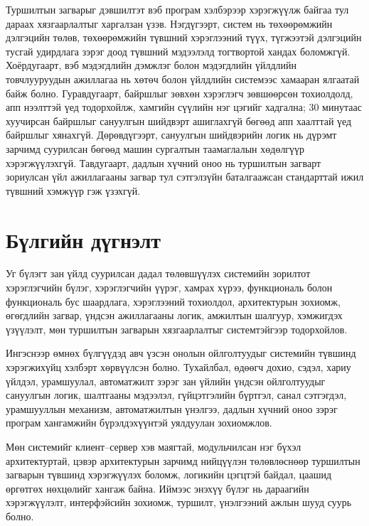 Туршилтын загварыг дэвшилтэт вэб програм хэлбэрээр хэрэгжүүлж байгаа тул дараах хязгаарлалтыг харгалзан үзэв. Нэгдүгээрт, систем нь төхөөрөмжийн дэлгэцийн төлөв, төхөөрөмжийн түвшний хэрэглээний түүх, түгжээтэй дэлгэцийн тусгай удирдлага зэрэг доод түвшний мэдээлэлд тогтвортой хандах боломжгүй. Хоёрдугаарт, вэб мэдэгдлийн дэмжлэг болон мэдэгдлийн үйлдлийн товчлууруудын ажиллагаа нь хөтөч болон үйлдлийн системээс хамааран ялгаатай байж болно. Гуравдугаарт, байршлыг зөвхөн хэрэглэгч зөвшөөрсөн тохиолдолд, апп нээлттэй үед тодорхойлж, хамгийн сүүлийн нэг цэгийг хадгална; 30 минутаас хуучирсан байршлыг сануулгын шийдвэрт ашиглахгүй бөгөөд апп хаалттай үед байршлыг хянахгүй. Дөрөвдүгээрт, сануулгын шийдвэрийн логик нь дүрэмт зарчимд суурилсан бөгөөд машин сургалтын таамаглалын хөдөлгүүр хэрэгжүүлэхгүй. Тавдугаарт, дадлын хүчний оноо нь туршилтын загварт зориулсан үйл ажиллагааны загвар тул сэтгэлзүйн баталгаажсан стандарттай ижил түвшний хэмжүүр гэж үзэхгүй.

\section{Бүлгийн дүгнэлт}

Уг бүлэгт зан үйлд суурилсан дадал төлөвшүүлэх системийн зорилтот хэрэглэгчийн бүлэг, хэрэглэгчийн үүрэг, хамрах хүрээ, функциональ болон функциональ бус шаардлага, хэрэглээний тохиолдол, архитектурын зохиомж, өгөгдлийн загвар, үндсэн ажиллагааны логик, амжилтын шалгуур, хэмжигдэх үзүүлэлт, мөн туршилтын загварын хязгаарлалтыг системтэйгээр тодорхойлов.

Ингэснээр өмнөх бүлгүүдэд авч үзсэн онолын ойлголтуудыг системийн түвшинд хэрэгжихүйц хэлбэрт хөрвүүлсэн болно. Тухайлбал, өдөөгч дохио, сэдэл, хариу үйлдэл, урамшуулал, автоматжилт зэрэг зан үйлийн үндсэн ойлголтуудыг сануулгын логик, шалтгааны мэдээлэл, гүйцэтгэлийн бүртгэл, санал сэтгэгдэл, урамшууллын механизм, автоматжилтын үнэлгээ, дадлын хүчний оноо зэрэг програм хангамжийн бүрэлдэхүүнтэй уялдуулан зохиомжлов.

Мөн системийг клиент--сервер хэв маягтай, модульчилсан нэг бүхэл архитектуртай, цэвэр архитектурын зарчимд нийцүүлэн төлөвлөснөөр туршилтын загварын түвшинд хэрэгжүүлэх боломж, логикийн цэгцтэй байдал, цаашид өргөтгөх нөхцөлийг хангаж байна. Иймээс энэхүү бүлэг нь дараагийн хэрэгжүүлэлт, интерфэйсийн зохиомж, туршилт, үнэлгээний ажлын шууд суурь болно.


